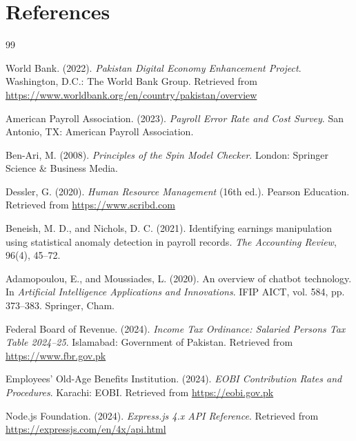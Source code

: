 \documentclass[12pt,a4paper]{report}
\begin{document}
\chapter{References}
\label{chap:references}

\begingroup
\renewcommand{\chapter}[2]{}
\sloppy
\begin{thebibliography}{99}

World Bank. (2022). \textit{Pakistan Digital Economy Enhancement Project}. Washington, D.C.: The World Bank Group. Retrieved from \url{https://www.worldbank.org/en/country/pakistan/overview}

American Payroll Association. (2023). \textit{Payroll Error Rate and Cost Survey}. San Antonio, TX: American Payroll Association.

Ben-Ari, M. (2008). \textit{Principles of the Spin Model Checker}. London: Springer Science \& Business Media.

Dessler, G. (2020). \textit{Human Resource Management} (16th ed.). Pearson Education. Retrieved from \url{https://www.scribd.com}

Beneish, M. D., and Nichols, D. C. (2021). Identifying earnings manipulation using statistical anomaly detection in payroll records. \textit{The Accounting Review}, 96(4), 45--72.

Adamopoulou, E., and Moussiades, L. (2020). An overview of chatbot technology. In \textit{Artificial Intelligence Applications and Innovations}. IFIP AICT, vol. 584, pp. 373--383. Springer, Cham.

Federal Board of Revenue. (2024). \textit{Income Tax Ordinance: Salaried Persons Tax Table 2024--25}. Islamabad: Government of Pakistan. Retrieved from \url{https://www.fbr.gov.pk}

Employees' Old-Age Benefits Institution. (2024). \textit{EOBI Contribution Rates and Procedures}. Karachi: EOBI. Retrieved from \url{https://eobi.gov.pk}

Node.js Foundation. (2024). \textit{Express.js 4.x API Reference}. Retrieved from \url{https://expressjs.com/en/4x/api.html}


\end{thebibliography}
\end{document}
